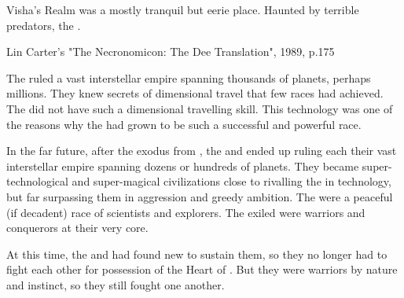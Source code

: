 Visha's Realm was a mostly tranquil but eerie place. 
Haunted by terrible predators, the \vorcanths. 

Lin Carter's "The Necronomicon: The Dee Translation", 1989, p.175



The \xss ruled a vast interstellar empire spanning thousands of planets, perhaps millions. 
They knew secrets of dimensional travel that few races had achieved.
The \banes did not have such a dimensional travelling skill. 
This technology was one of the reasons why the \xss had grown to be such a successful and powerful race. 


In the far future, after the exodus from \Miith, the \dragons and \resphain ended up ruling each their vast interstellar empire spanning dozens or hundreds of planets. 
They became super-technological and super-magical civilizations close to rivalling the \voyagers in technology, but far surpassing them in aggression and greedy ambition. 
The \voyagers were a peaceful (if decadent) race of scientists and explorers. 
The exiled \Miithians were warriors and conquerors at their very core.

At this time, the \dragons and \resphain had found new \dweomers to sustain them, so they no longer had to fight each other for possession of the Heart of \Miith. 
But they were warriors by nature and instinct, so they still fought one another. 



